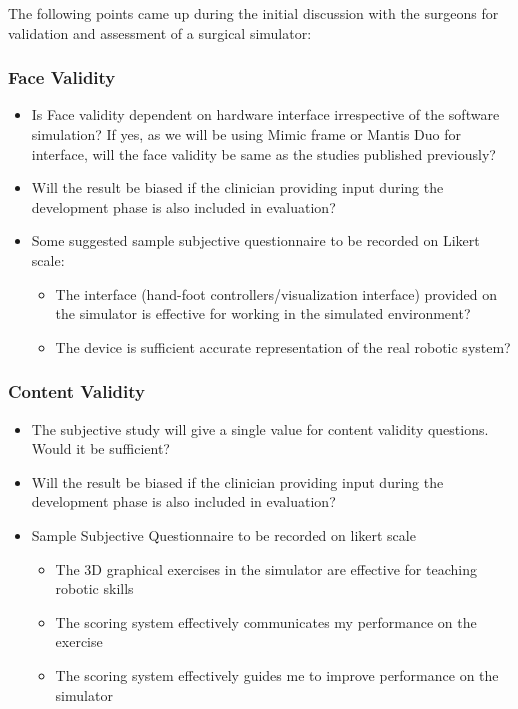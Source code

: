 The following points came up during the initial discussion with the surgeons for validation and assessment of a surgical simulator:

\subsubsection{Face Validity}\label{sssec:face_validity}
\begin{itemize}
  \item Is Face validity dependent on hardware interface irrespective of the software simulation? If yes, as we will be using Mimic frame or Mantis Duo for interface, will the face validity be same as the studies published previously?
  \item Will the result be biased if the clinician providing input during the development phase is also included in evaluation?
  \item Some suggested sample subjective questionnaire to be recorded on Likert scale:
  \begin{itemize}
    \item The interface (hand-foot controllers/visualization interface) provided on the simulator is effective for working in the simulated environment?
    \item The device is sufficient accurate representation of the real robotic system?
  \end{itemize}
\end{itemize}


\subsubsection{Content Validity}\label{sssec:content_validity}
\begin{itemize}
  \item The subjective study will give a single value for content validity questions. Would it be sufficient?
  \item Will the result be biased if the clinician providing input during the development phase is also included in evaluation?
  \item Sample Subjective Questionnaire to be recorded on likert scale
  \begin{itemize}
    \item The 3D graphical exercises in the simulator are effective for teaching robotic skills
    \item The scoring system effectively communicates my performance on the exercise
    \item The scoring system effectively guides me to improve performance on the simulator
  \end{itemize}
\end{itemize}

